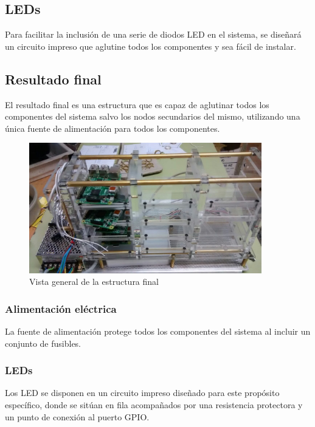 \subsection{LEDs}

Para facilitar la inclusión de una serie de diodos LED en el sistema, se diseñará un circuito impreso que aglutine todos los componentes y sea fácil de instalar.

\subsection{Resultado final}

El resultado final es una estructura que es capaz de aglutinar todos los componentes del sistema salvo los nodos secundarios del mismo, utilizando una única fuente de alimentación para todos los componentes.

\begin{figure}[H]
\centering
\includegraphics[width=0.9\textwidth]{Chapters/Chapter5/Figures/estructuraFinal/general}
\caption{Vista general de la estructura final}
\end{figure}

\subsubsection{Alimentación eléctrica}

La fuente de alimentación protege todos los componentes del sistema al incluir un conjunto de fusibles.
\citationneeded[FOTO]

\subsubsection{LEDs}

Los LED se disponen en un circuito impreso diseñado para este propósito específico, donde se sitúan en fila acompañados por una resistencia protectora y un punto de conexión al puerto GPIO.

